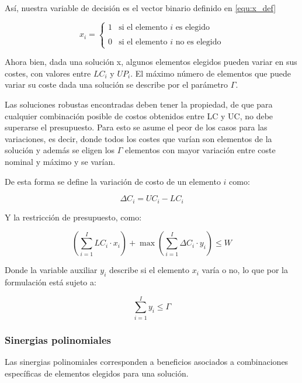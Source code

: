 \documentclass[spanish, a4paper, 12pt, twoside, openany,final]{book}
\numberwithin{equation}{section}
\begin{document}
    Así, nuestra variable de decisión es el vector binario definido en \ref{equ:x_def}
    
    \begin{equation}
    	\label{equ:x_def}
    	x_i = \left\{ 
    	\begin{array}{lc}
    		1 & \text{si el elemento $i$ es elegido}\\ \\ 
    		0 &  \text{si el elemento $i$ no es elegido}
    	\end{array} \right.
    \end{equation}
    
    Ahora bien, dada una solución x, algunos elementos elegidos pueden variar en sus costes, con valores entre $LC_i$ y $UP_i$. El máximo número de elementos que puede variar su coste dada una solución se describe por el parámetro $\Gamma$.
    
    Las soluciones robustas encontradas deben tener la propiedad, de que para cualquier combinación posible de costos obtenidos entre LC y UC, no debe superarse el presupuesto. Para esto se asume el peor de los casos para las variaciones, es decir, donde todos los costes que varían son elementos de la solución y además se eligen los $\Gamma$ elementos con mayor variación entre coste nominal y máximo y se varían.
    
    De esta forma se define la variación de costo de un elemento $i$ como:
    
    $$
    \Delta C_i  = UC_i - LC_i
    $$
    
    Y la restricción de presupuesto, como:
    
    \begin{equation}
   		\label{eq:costs}
    	\left( \sum_{i=1}^I LC_i\cdot x_i\right)  + \max \left( \sum_{i=1}^I \Delta C_i\cdot y_i \right) \leq W
    \end{equation}
    
    Donde la variable auxiliar $y_i$ describe si el elemento $x_i$ varía o no, lo que por la formulación está sujeto a:
    
    $$
    \sum_{i=1}^I y_i \leq \Gamma
    $$
    
    \subsubsection{Sinergias polinomiales}
    Las sinergias polinomiales corresponden a beneficios asociados a combinaciones específicas de elementos elegidos para una solución.
    
\end{document}
